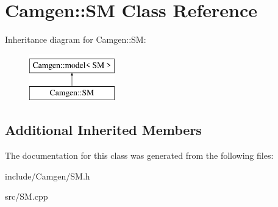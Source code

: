 \hypertarget{a00498}{\section{Camgen\-:\-:S\-M Class Reference}
\label{a00498}
}
Inheritance diagram for Camgen\-:\-:S\-M\-:\begin{figure}[H]
\begin{center}
\leavevmode
\includegraphics[height=2.000000cm]{a00498}
\end{center}
\end{figure}
\subsection*{Additional Inherited Members}


The documentation for this class was generated from the following files\-:\begin{DoxyCompactItemize}
\item 
include/\-Camgen/S\-M.\-h\item 
src/S\-M.\-cpp\end{DoxyCompactItemize}
